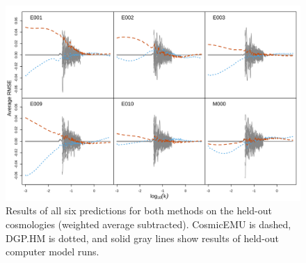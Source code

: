\documentclass[11pt]{article}
\begin{document}
\begin{figure}[ht]
    \centering
    \includegraphics[width=6in]{pred_1to6.png}
    \caption{Results of all six predictions for both methods on the held-out 
    cosmologies (weighted average subtracted). CosmicEMU is dashed, DGP.HM is dotted, 
    and solid gray lines show results of held-out computer model runs.}
    \label{fig:plot_pred_1to6}
\end{figure}



\end{document}
